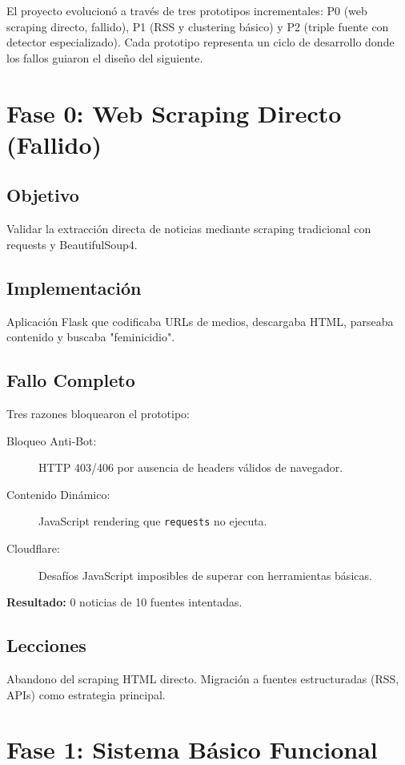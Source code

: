 
El proyecto evolucionó a través de tres prototipos incrementales: P0 (web scraping directo, fallido), P1 (RSS y clustering básico) y P2 (triple fuente con detector especializado). Cada prototipo representa un ciclo de desarrollo donde los fallos guiaron el diseño del siguiente.

\section{Fase 0: Web Scraping Directo (Fallido)}
\label{sec:prototipo0}

\subsection{Objetivo}
Validar la extracción directa de noticias mediante scraping tradicional con requests y BeautifulSoup4.

\subsection{Implementación}
Aplicación Flask que codificaba URLs de medios, descargaba HTML, parseaba contenido y buscaba "feminicidio".

\subsection{Fallo Completo}
Tres razones bloquearon el prototipo:

\begin{description}
    \item[Bloqueo Anti-Bot:] HTTP 403/406 por ausencia de headers válidos de navegador.
    \item[Contenido Dinámico:] JavaScript rendering que \texttt{requests} no ejecuta.
    \item[Cloudflare:] Desafíos JavaScript imposibles de superar con herramientas básicas.
\end{description}

\textbf{Resultado:} 0 noticias de 10 fuentes intentadas.

\subsection{Lecciones}
Abandono del scraping HTML directo. Migración a fuentes estructuradas (RSS, APIs) como estrategia principal.

\section{Fase 1: Sistema Básico Funcional}
\label{sec:prototipo1}

